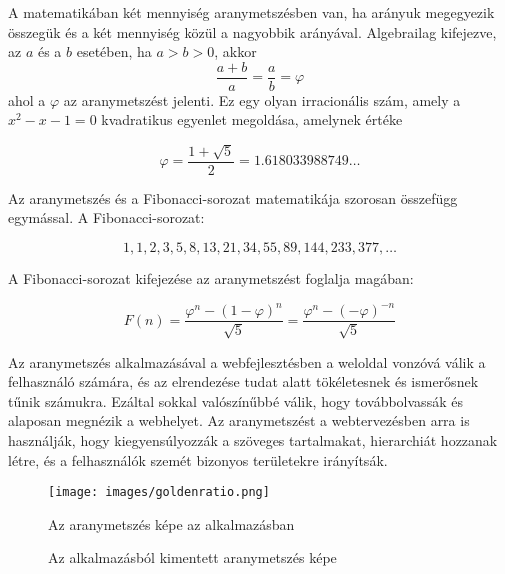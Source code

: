 

A matematikában két mennyiség aranymetszésben van, ha arányuk megegyezik összegük és a két mennyiség közül a nagyobbik arányával. Algebrailag kifejezve, az $a$ és a $b$ esetében, ha $a>b>0$, akkor
$$\frac{a+b}{a} = \frac{a}{b} = \varphi$$
ahol a $\varphi$ az aranymetszést jelenti. Ez egy olyan irracionális szám, amely a $x^{2}-x-1=0$ kvadratikus egyenlet megoldása, amelynek értéke

$$\varphi =\frac{1+\sqrt{5}}{2}=1.618033988749\dots$$


Az aranymetszés és a Fibonacci-sorozat matematikája szorosan összefügg egymással. A Fibonacci-sorozat:

$$1, 1, 2, 3, 5, 8, 13, 21, 34, 55, 89, 144, 233, 377, \dots$$

A Fibonacci-sorozat kifejezése az aranymetszést foglalja magában:

$$F(n)=\frac{\varphi^{n}-(1-\varphi )^{n}}{\sqrt{5}} = \frac{{\varphi ^{n}-(-\varphi )^{-n}}}{\sqrt {5}}$$

Az aranymetszés alkalmazásával a webfejlesztésben a weloldal vonzóvá válik a felhasználó számára, és az elrendezése tudat alatt tökéletesnek és ismerősnek tűnik számukra. Ezáltal sokkal valószínűbbé válik, hogy továbbolvassák és alaposan megnézik a webhelyet. Az aranymetszést a webtervezésben arra is használják, hogy kiegyensúlyozzák a szöveges tartalmakat, hierarchiát hozzanak létre, és a felhasználók szemét bizonyos területekre irányítsák.

\begin{figure}[!h]
	\label{fig:gr_editor}
	\centering
	\texttt{[image: images/goldenratio.png]}
	\caption{Az aranymetszés képe az alkalmazásban}
\end{figure}

\begin{figure}[!h]
	\label{fig:gr_tikz}
	\centering
	\scalebox{1.4}{}
	\caption{Az alkalmazásból kimentett aranymetszés képe}
\end{figure}